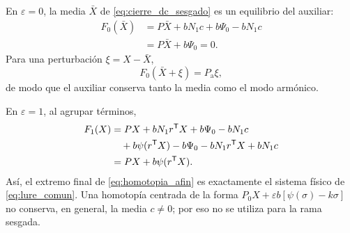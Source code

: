 En \(\varepsilon=0\), la media \(\bar X\) de
\cref{eq:cierre_dc_sesgado} es un equilibrio del auxiliar:
\begin{align*}
F_0(\bar X)
&=P\bar X+bN_1c+b\Psi_0-bN_1c\\
&=P\bar X+b\Psi_0=0.
\end{align*}
Para una perturbación \(\xi=X-\bar X\),
\[
F_0(\bar X+\xi)=P_{\mathrm a}\xi,
\]
de modo que el auxiliar conserva tanto la media como el modo armónico.

En \(\varepsilon=1\), al agrupar términos,
\begin{align*}
F_1(X)
&=PX+bN_1r^{\mathsf T}X+b\Psi_0-bN_1c\\
&\quad+b\psi(r^{\mathsf T}X)-b\Psi_0-bN_1r^{\mathsf T}X+bN_1c\\
&=PX+b\psi(r^{\mathsf T}X).
\end{align*}
Así, el extremo final de \cref{eq:homotopia_afin} es exactamente el sistema
físico de \cref{eq:lure_comun}. Una homotopía centrada de la forma
\(P_0X+\varepsilon b[\psi(\sigma)-k\sigma]\) no conserva, en general, la
media \(c\neq0\); por eso no se utiliza para la rama sesgada.
\fi

